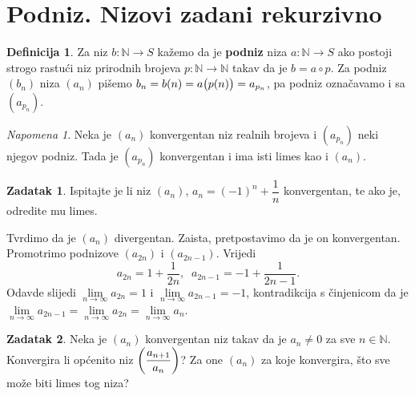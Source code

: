 \documentclass{book}
\let\originalleft\left
\let\originalright\right
\renewcommand{\left}{\mathopen{}\mathclose\bgroup\originalleft}
\renewcommand{\right}{\aftergroup\egroup\originalright}
\renewenvironment{proof}{%
    \vspace{-\parskip}\begin{oldproof}%
    }{%
    \end{oldproof}%
}
\theoremstyle{definition}
\theoremstyle{definition}
\newtheorem{definition}{Definicija}
\newtheorem{exercise}{Zadatak}
\theoremstyle{remark}
\newtheorem{remark}{Napomena}
\begin{document}
\section{Podniz. Nizovi zadani rekurzivno}
\begin{definition}
Za niz $b : \mathbb{N}\to S$ kažemo da je \textbf{podniz} niza $a :\mathbb{N}\to S$ ako postoji strogo rastući niz prirodnih brojeva $p : \mathbb{N}\to \mathbb{N}$ takav da je $b=a\circ p$. Za podniz $(b_n)$ niza $(a_n)$ pišemo $b_n=b(n)=a\left(p(n)\right)=a_{p_n}$, pa podniz označavamo i sa $(a_{p_n})$.
\end{definition}
\begin{remark}
\label{onsubsequences}
Neka je $(a_n)$ konvergentan niz realnih brojeva i $(a_{p_n})$ neki njegov podniz. Tada je $(a_{p_n})$ konvergentan i ima isti limes kao i $(a_n)$.
\end{remark}
\begin{exercise}
Ispitajte je li niz $(a_n)$, $a_n=(-1)^n+\dfrac{1}{n}$ konvergentan, te ako je, odredite mu limes.
\end{exercise}
\begin{proof}[Rješenje]
Tvrdimo da je $(a_n)$ divergentan. Zaista, pretpostavimo da je on konvergentan. Promotrimo podnizove $(a_{2n})$ i $(a_{2n-1})$. Vrijedi
$$a_{2n}=1+\dfrac{1}{2n},\;\;
a_{2n-1}=-1+\dfrac{1}{2n-1}.$$
Odavde slijedi $\lim\limits_{n\to \infty}{a_{2n}}=1$ i $\lim\limits_{n\to \infty}{a_{2n-1}}=-1$, kontradikcija s činjenicom da je $\lim\limits_{n\to \infty}{a_{2n-1}}=\lim\limits_{n\to \infty}{a_{2n}}=\lim\limits_{n\to \infty}{a_{n}}$.
\end{proof}
\begin{exercise}
Neka je $(a_n)$ konvergentan niz takav da je $a_n\neq 0$ za sve $n\in \mathbb{N}$. Konvergira li općenito niz $\left(\dfrac{a_{n+1}}{a_n}\right)$? Za one $(a_n)$ za koje konvergira, što sve može biti limes tog niza?
\end{exercise}
\end{document}
